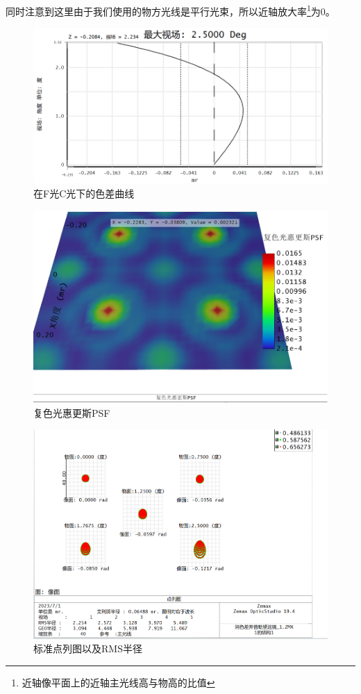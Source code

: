 \documentclass{article}
\begin{document}
  同时注意到这里由于我们使用的物方光线是平行光束，所以近轴放大率\footnote{近轴像平面上的近轴主光线高与物高的比值}为0。
          \begin{figure}[H]
              \centering
              \includegraphics[width=12cm]{img/10.png}
\caption{在F光C光下的色差曲线}
              \end{figure}
              \begin{figure}[H]
                \centering
                \includegraphics[width=12cm]{img/11.png}
  \caption{复色光惠更斯PSF}
                \end{figure}

                \begin{figure}[H]
                  \centering
                  \includegraphics[width=18cm]{img/13.png}
    \caption{标准点列图以及RMS半径}
  \end{figure}
\end{document}
